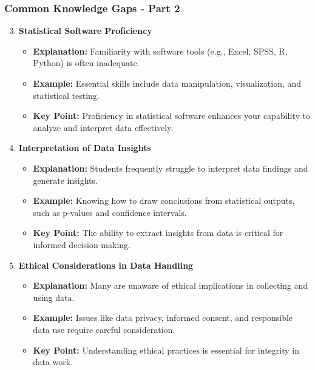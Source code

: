 \documentclass[aspectratio=169]{beamer}
\begin{document}
\begin{frame}[fragile]
    \frametitle{Common Knowledge Gaps - Part 2}
    \begin{enumerate}
        \setcounter{enumi}{2}
        \item \textbf{Statistical Software Proficiency}
            \begin{itemize}
                \item \textbf{Explanation:} Familiarity with software tools (e.g., Excel, SPSS, R, Python) is often inadequate.
                \item \textbf{Example:} Essential skills include data manipulation, visualization, and statistical testing.
                \item \textbf{Key Point:} Proficiency in statistical software enhances your capability to analyze and interpret data effectively.
            \end{itemize}

        \item \textbf{Interpretation of Data Insights}
            \begin{itemize}
                \item \textbf{Explanation:} Students frequently struggle to interpret data findings and generate insights.
                \item \textbf{Example:} Knowing how to draw conclusions from statistical outputs, such as p-values and confidence intervals.
                \item \textbf{Key Point:} The ability to extract insights from data is critical for informed decision-making.
            \end{itemize}

        \item \textbf{Ethical Considerations in Data Handling}
            \begin{itemize}
                \item \textbf{Explanation:} Many are unaware of ethical implications in collecting and using data.
                \item \textbf{Example:} Issues like data privacy, informed consent, and responsible data use require careful consideration.
                \item \textbf{Key Point:} Understanding ethical practices is essential for integrity in data work.
            \end{itemize}
    \end{enumerate}
\end{frame}
\end{document}
